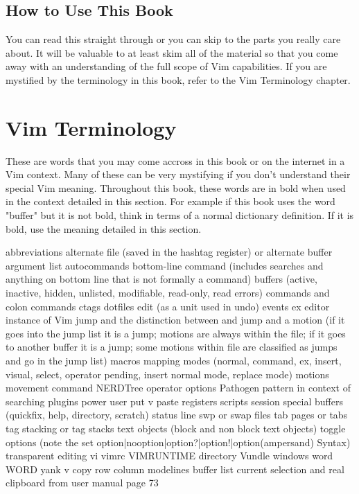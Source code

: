 \documentclass[12pt, oneside]{book}
\begin{document}
\section{How to Use This Book}
You can read this straight through or you can skip to the parts you really care about.  It will be valuable to at least skim all of the material so that you come away with an understanding of the full
scope of Vim capabilities.  If you are mystified by the terminology in this book, refer to the Vim Terminology chapter.

\chapter{Vim Terminology}
These are words that you may come accross in this book or on the internet in a Vim context.  Many of these can be very mystifying if you don't understand their special Vim meaning.  Throughout this
book, these words are in bold when used in the context detailed in this section.  For example if this book uses the word "buffer" but it is not bold, think in terms of a normal dictionary definition.
If it is bold, use the meaning detailed in this section.

abbreviations
alternate file (saved in the hashtag register) or alternate buffer
argument list
autocommands
bottom-line command (includes searches and anything on bottom line that is not formally a command)
buffers (active, inactive, hidden, unlisted, modifiable, read-only, read errors)
commands and colon commands
ctags
dotfiles
edit (as a unit used in undo)
events
ex editor
instance of Vim
jump and the distinction between and jump and a motion (if it goes into the jump list it is a jump; motions are always within the file; if it goes to another buffer it is a jump; some motions within file are classified as jumps and go in the jump list)
macros
mapping
modes (normal, command, ex, insert, visual, select, operator pending, insert normal mode, replace mode)
motions
movement command
NERDTree
operator
options
Pathogen
pattern in context of searching
plugins
power user
put v paste
registers
scripts
session
special buffers (quickfix, help, directory, scratch)
status line
swp or swap files
tab pages or tabs
tag stacking or tag stacks
text objects (block and non block text objects)
toggle options (note the set option|nooption|option?|option!|option(ampersand) Syntax)
transparent editing
vi
vimrc
VIMRUNTIME directory
Vundle
windows
word
WORD
yank v copy
row
column
modelines
buffer list
current selection and real clipboard from user manual page 73
\end{document}

